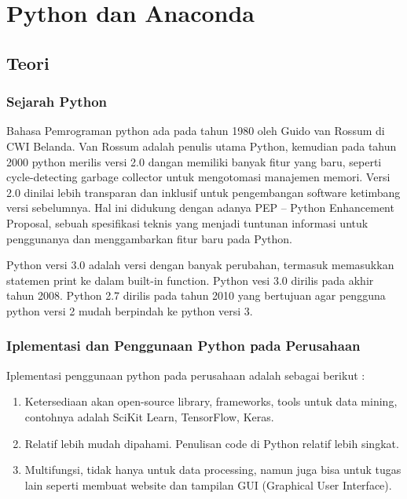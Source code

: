 \chapter{Python dan Anaconda}
\section{Teori}
\subsection{Sejarah Python}
\hspace{0,5cm} Bahasa Pemrograman python ada pada tahun 1980 oleh Guido van Rossum di CWI Belanda. Van Rossum  adalah penulis utama Python, kemudian pada tahun 2000 python merilis versi 2.0 dangan memiliki banyak fitur yang baru, seperti cycle-detecting garbage collector untuk mengotomasi manajemen memori. Versi 2.0 dinilai lebih transparan dan inklusif untuk pengembangan software ketimbang versi sebelumnya. Hal ini didukung dengan adanya PEP – Python Enhancement Proposal, sebuah spesifikasi teknis yang menjadi tuntunan informasi untuk penggunanya dan menggambarkan fitur baru pada Python.\\
\par Python versi 3.0 adalah versi dengan banyak perubahan, termasuk memasukkan statemen print ke dalam built-in function. Python vesi 3.0 dirilis pada akhir tahun 2008. Python 2.7 dirilis pada tahun 2010 yang bertujuan agar pengguna python versi 2 mudah berpindah ke python versi 3.\\
\subsection{Iplementasi dan Penggunaan Python pada Perusahaan}
\par Iplementasi penggunaan python pada perusahaan adalah sebagai berikut :

\begin{enumerate}
\item Ketersediaan akan open-source library, frameworks, tools untuk data mining, contohnya adalah SciKit Learn, TensorFlow, Keras.
\item Relatif lebih mudah dipahami. Penulisan code di Python relatif lebih singkat.
\item Multifungsi, tidak hanya untuk data processing, namun juga bisa untuk tugas lain seperti membuat website dan tampilan GUI (Graphical User Interface).
\end{enumerate}


